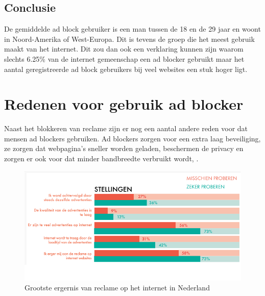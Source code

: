 \documentclass[pdftex,a4paper,12pt,twoside]{report}
\begin{document}
\subsection{Conclusie}
\label{sec Conclusie}
De gemiddelde ad block gebruiker is een man tussen de 18 en de 29 jaar en woont in Noord-Amerika of West-Europa. Dit is tevens de groep die het meest gebruik maakt van het internet. Dit zou dan ook een verklaring kunnen zijn waarom slechts 6.25\% van de internet gemeenschap een ad blocker gebruikt maar het aantal geregistreerde ad block gebruikers bij veel websites een stuk hoger ligt.%

\section{Redenen voor gebruik ad blocker}
\label{sec:Redenen voor gebruik ad blocker}
Naast het blokkeren van reclame zijn er nog een aantal andere reden voor dat mensen ad blockers gebruiken. Ad blockers zorgen voor een extra laag beveiliging, ze zorgen dat webpagina's sneller worden geladen, beschermen de privacy en zorgen er ook voor dat minder bandbreedte verbruikt wordt, \cite{IAB2014}.

\begin{figure}[h!]
\centering
\includegraphics[width=12cm]{img/redenadblockgebruik}
\caption{Grootste ergernis van reclame op het internet in Nederland}
\label{fig: redenadblockgebruik}
\end{figure}
\end{document}

